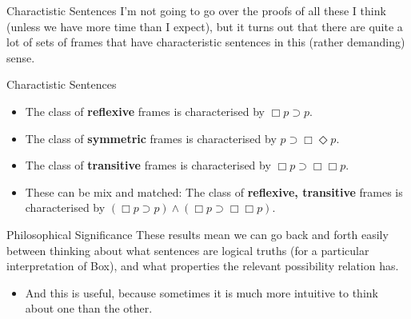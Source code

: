 \documentclass[
  14pt,
  letterpaper,
  ignorenonframetext,
  handout]{beamer}
\providecommand{\tightlist}{%
  \setlength{\itemsep}{0pt}\setlength{\parskip}{0pt}}\usepackage{longtable,booktabs,array}
\begin{document}
\begin{frame}{Charactistic Sentences}
\protect\hypertarget{charactistic-sentences}{}
I'm not going to go over the proofs of all these I think (unless we have
more time than I expect), but it turns out that there are quite a lot of
sets of frames that have characteristic sentences in this (rather
demanding) sense.
\end{frame}

\begin{frame}{Charactistic Sentences}
\protect\hypertarget{charactistic-sentences-1}{}
\begin{itemize}
\tightlist
\item
  The class of \textbf{reflexive} frames is characterised by
  \(\Box p \supset p\).
\item
  The class of \textbf{symmetric} frames is characterised by
  \(p \supset \Box \Diamond p\).
\item
  The class of \textbf{transitive} frames is characterised by
  \(\Box p \supset \Box \Box p\).
\item
  These can be mix and matched: The class of \textbf{reflexive,
  transitive} frames is characterised by
  \((\Box p \supset p) \wedge (\Box p \supset \Box \Box p)\).
\end{itemize}
\end{frame}

\begin{frame}{Philosophical Significance}
\protect\hypertarget{philosophical-significance}{}
These results mean we can go back and forth easily between thinking
about what sentences are logical truths (for a particular interpretation
of Box), and what properties the relevant possibility relation has.

\begin{itemize}
\tightlist
\item
  And this is useful, because sometimes it is much more intuitive to
  think about one than the other.
\end{itemize}
\end{frame}
\end{document}
